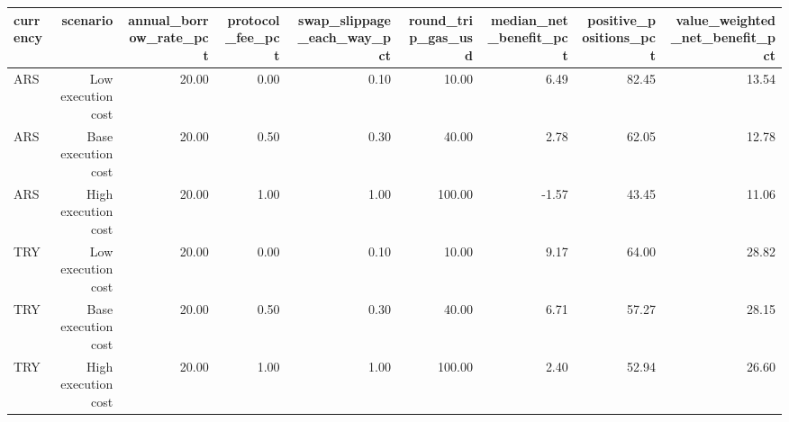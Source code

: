 \begin{tabular}{lrrrrrrrr}
\toprule
currency & scenario & annual\_borrow\_rate\_pct & protocol\_fee\_pct & swap\_slippage\_each\_way\_pct & round\_trip\_gas\_usd & median\_net\_benefit\_pct & positive\_positions\_pct & value\_weighted\_net\_benefit\_pct \\
\midrule
ARS & Low execution cost & 20.00 & 0.00 & 0.10 & 10.00 & 6.49 & 82.45 & 13.54 \\
ARS & Base execution cost & 20.00 & 0.50 & 0.30 & 40.00 & 2.78 & 62.05 & 12.78 \\
ARS & High execution cost & 20.00 & 1.00 & 1.00 & 100.00 & -1.57 & 43.45 & 11.06 \\
TRY & Low execution cost & 20.00 & 0.00 & 0.10 & 10.00 & 9.17 & 64.00 & 28.82 \\
TRY & Base execution cost & 20.00 & 0.50 & 0.30 & 40.00 & 6.71 & 57.27 & 28.15 \\
TRY & High execution cost & 20.00 & 1.00 & 1.00 & 100.00 & 2.40 & 52.94 & 26.60 \\
\bottomrule
\end{tabular}
